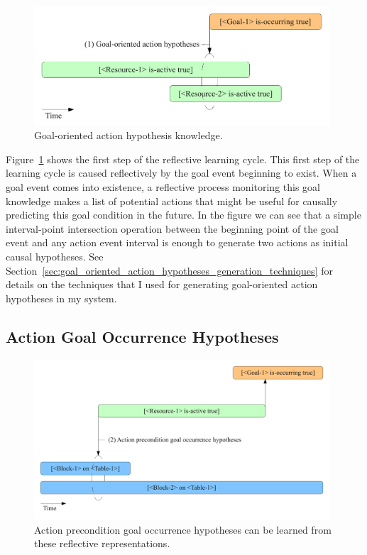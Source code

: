 \begin{figure}[bth]
  \center
  \includegraphics[width=11cm]{gfx/learning_to_plan-1-goal_oriented_action_hypotheses}
  \caption[Goal-oriented action hypothesis knowledge]{Goal-oriented action hypothesis knowledge.}
  \label{fig:goal_oriented_action_hypotheses}
\end{figure}


Figure~\ref{fig:goal_oriented_action_hypotheses} shows the first step
of the reflective learning cycle.  This first step of the learning
cycle is caused reflectively by the goal event beginning to exist.
When a goal event comes into existence, a reflective process
monitoring this goal knowledge makes a list of potential actions that
might be useful for causally predicting this goal condition in the
future.  In the figure we can see that a simple interval-point
intersection operation between the beginning point of the goal event
and any action event interval is enough to generate two actions as
initial causal hypotheses.  See
Section~\ref{sec:goal_oriented_action_hypotheses_generation_techniques}
for details on the techniques that I used for generating goal-oriented
action hypotheses in my system.


\subsection{Action Goal Occurrence Hypotheses}

\begin{figure}[bth]
  \center
  \includegraphics[width=11cm]{gfx/learning_to_plan-2-action_precondition_goal_occurrence_hypotheses}
  \caption[Action precondition goal occurrence hypotheses]{Action
    precondition goal occurrence hypotheses can be learned from these
    reflective representations.}
  \label{fig:action_precondition_goal_occurrence_hypotheses}
\end{figure}

